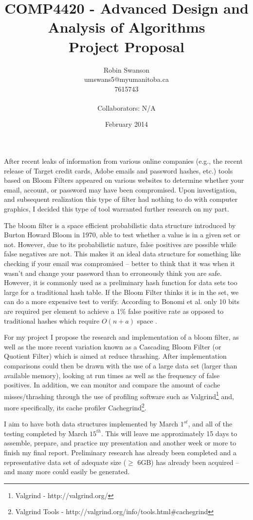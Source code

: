 \documentclass[10pt]{article}
\title{COMP4420 - Advanced Design and Analysis of Algorithms \\ Project Proposal}
\author{Robin Swanson \\ umswans5@myumanitoba.ca \\ 7615743 \\ \\ Collaborators: N/A}
\date{February 2014}
\begin{document}
\maketitle

After recent leaks of information from various online companies (e.g., the recent release of Target credit cards, Adobe emails and password hashes, etc.) tools based on Bloom Filters appeared on various websites to determine whether your email, account, or password may have been compromised. Upon investigation, and subsequent realization this type of filter had nothing to do with computer graphics, I decided this type of tool warranted further research on my part.

The bloom filter is a space efficient probabilistic data structure introduced by Burton Howard Bloom in 1970\cite{Bloom}, able to test whether a value is in a given set or not. However, due to its probabilistic nature, false positives are possible while false negatives are not. This makes it an ideal data structure for something like checking if your email was compromised -- better to think that it was when it wasn't and change your password than to erroneously think you are safe. However, it is commonly used as a preliminary hash function for data sets too large for a traditional hash table. If the Bloom Filter thinks it is in the set, we can do a more expensive test to verify. According to Bonomi et al.\cite{Bonomi} only 10 bits are required per element to achieve a 1\% false positive rate as opposed to traditional hashes which require $O(n + a)$ space .

For my project I propose the research and implementation of a bloom filter, as well as the more recent variation known as a Cascading Bloom Filter\cite{Bender} (or Quotient Filter) which is aimed at reduce thrashing. After implementation comparisons could then be drawn with the use of a large data set (larger than available memory), looking at run times as well as the frequency of false positives. In addition, we can monitor and compare the amount of cache misses/thrashing through the use of profiling software such as Valgrind\footnote{Valgrind - http://valgrind.org/} and, more specifically, its cache profiler Cachegrind\footnote{Valgrind Tools - http://valgrind.org/info/tools.html\#cachegrind}.

I aim to have both data structures implemented by March $1^{st}$, and all of the testing completed by March $15^{th}$. This will leave me approximately 15 days to assemble, prepare, and practice my presentation and another week or more to finish my final report. Preliminary research has already been completed and a representative data set of adequate size ($\geq$ 6GB) has already been acquired -- and many more could easily be generated.
\end{document}
